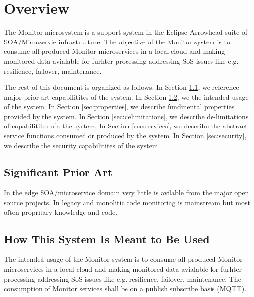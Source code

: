 \documentclass[a4paper]{arrowhead}
\begin{document}
\newpage

\tableofcontents
\newpage

\section{Overview}
\label{sec:overview}
  The Monitor microsystem is a support system in the Eclipse
    Arrowhead suite of SOA/Microservie infrastructure. The objective
    of the Monitor system is to consume all produced Monitor
    microservices in a local cloud and making monitored data avialable
    for furhter processing addressing SoS issues like e.g. resilience,
    failover, maintenance. 
    
The rest of this document is organized as follows.
In Section \ref{sec:prior_art}, we reference major prior art capabilitites
of the system.
In Section \ref{sec:use}, we the intended usage of the system.
In Section \ref{sec:properties}, we describe fundmental properties
provided by the system.
In Section \ref{sec:delimitations}, we describe de-limitations of capabilitites
ofn the system.
In Section \ref{sec:services}, we describe the abstract service
functions consumed or produced by the system.
In Section \ref{sec:security}, we describe the security capabilitites
of the system.


\subsection{Significant Prior Art}
\label{sec:prior_art}

In the edge SOA/microservice domain very little is avilable from the
major open source projects. In legacy and monolitic code monitoring is
mainstream but most often propritary knowledge and code. 

\subsection{How This System Is Meant to Be Used}
\label{sec:use}

The intended usage 
    of the Monitor system is to consume all produced Monitor
    microservices in a local cloud and making monitored data avialable
    for furhter processing addressing SoS issues like e.g. resilience,
    failover, maintenance. The consumption of Monitor services shall
    be on a publish subscribe basis (MQTT).  
    
\end{document}

